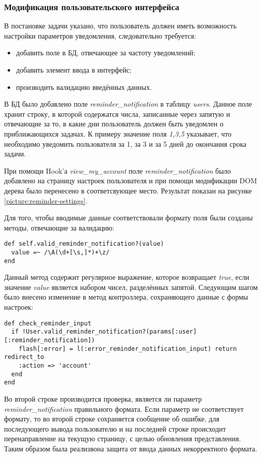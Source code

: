 \subsubsection{Модификация пользовательского интерфейса}
В постановке задачи указано, что пользователь должен иметь возможность
настройки параметров уведомления, следовательно требуется:
\begin{itemize}
  \item добавить поле в БД, отвечающее за частоту уведомлений;
  \item добавить элемент ввода в интерфейс;
  \item производить валидацию введённых данных.
\end{itemize}

В БД было добавлено поле \textit{reminder\_notification} в таблицу
\textit{users}. Данное поле хранит строку, в которой содержатся числа,
записанные через запятую и отвечающие за то, в какие дни пользователь должен
быть уведомлен о приближающихся задачах. К примеру значение поля \textit{1,3,5}
указывает, что необходимо уведомить пользователя за 1, за 3 и за 5 дней до
окончания срока задачи. 

При помощи Hook'а \textit{view\_my\_account} поле
\textit{reminder\_notification} было добавлено на страницу настроек
пользователя и при помощи модификации DOM дерева было перенесено в
соответсвующее место. Результат показан на рисунке
\ref{picture:reminder-settings}.

Для того, чтобы вводимые данные соответствовали формату поля были созданы
методы, отвечающие за валидацию:
\small{\begin{lstlisting}
def self.valid_reminder_notification?(value)
  value =~ /\A(\d+[\s,]*)+\z/
end
\end{lstlisting}}
Данный метод содержит регулярное выражение, которое возвращает \textit{true},
если значение \textit{value} является набором чисел, разделённых запятой.
Следующим шагом было внесено изменение в метод контроллера, сохраняющего данные
с формы настроек:
\small{\begin{lstlisting}
def check_reminder_input
  if !User.valid_reminder_notification?(params[:user][:reminder_notification])
    flash[:error] = l(:error_reminder_notification_input) return redirect_to
    :action => 'account'
  end
end
\end{lstlisting}}
Во второй строке производится проверка, является ли параметр
\textit{reminder\_notification} правильного формата.
Если параметр не соответствует формату, то во второй строке сохраняется
сообщение об ошибке, для последующего вывода пользователю и на последней строке
происходит перенаправление на текущую страницу, с  целью обновления
представления. Таким образом была реализвона защита от ввода данных
некорректного формата.

